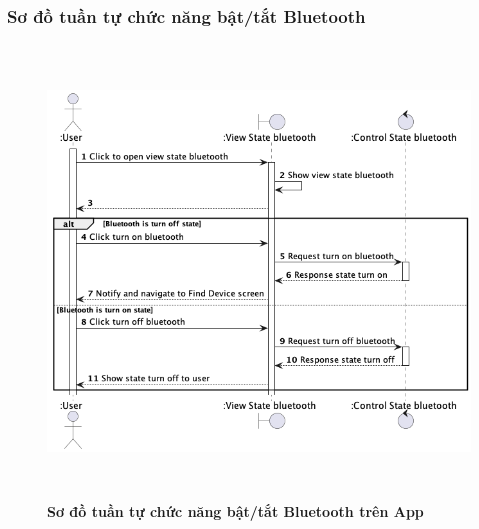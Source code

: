 \documentclass{article}%
\begin{document}
\subsubsection{Sơ đồ tuần tự chức năng bật/tắt Bluetooth}
  \begin{figure}[H]
        \centering
        \includegraphics[width=16cm,height=12cm]{Images/mobile_app/turn_on_off_bluetooth.png}
        \caption[Sơ đồ tuần tự chức năng bật/tắt Bluetooth trên App]{\bfseries \fontsize{12pt}{0pt}
        \selectfont Sơ đồ tuần tự chức năng bật/tắt Bluetooth trên App}
        \label{hinh21} %
  \end{figure}
\end{document}
